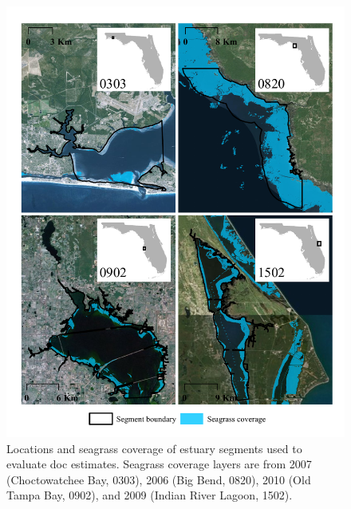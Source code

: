 \documentclass[letterpaper,12pt,oneside]{article}\usepackage[]{graphicx}\usepackage[]{color}
\begin{document}
\begin{figure}
\centerline{\includegraphics[width = \textwidth]{figs/seg_all.pdf}}
\caption{Locations and seagrass coverage of estuary segments used to evaluate \acl{doc} estimates.  Seagrass coverage layers are from 2007 (Choctowatchee Bay, 0303), 2006 (Big Bend, 0820), 2010 (Old Tampa Bay, 0902), and 2009 (Indian River Lagoon, 1502).}
\label{fig:seg_all}
\end{figure}
\end{document}
